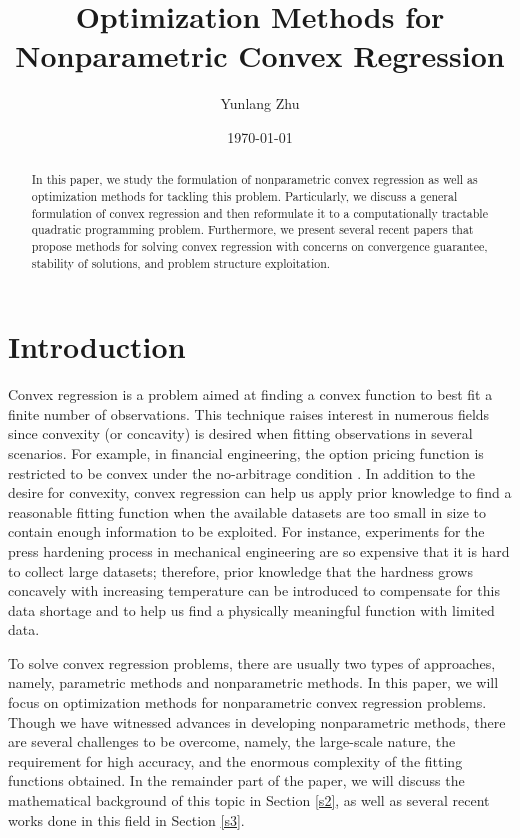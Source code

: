\documentclass{article}
\title{Optimization Methods for Nonparametric Convex Regression}
\author{Yunlang Zhu}
\date{\today}
\begin{document}
\maketitle

\begin{abstract}
    In this paper, we study the formulation of nonparametric convex regression as well as optimization methods for tackling this problem. Particularly, we discuss a general formulation of convex regression and then reformulate it to a computationally tractable quadratic programming problem. Furthermore, we present several recent papers that propose methods for solving convex regression with concerns on convergence guarantee, stability of solutions, and problem structure exploitation. 
\end{abstract}

\section{Introduction}
Convex regression is a problem aimed at finding a convex function to best fit a finite number of observations. This technique raises interest in numerous fields since convexity (or concavity) is desired when fitting observations in several scenarios. For example, in financial engineering, the option pricing function is restricted to be convex under the no-arbitrage condition \cite{Sahalia03}. In addition to the desire for convexity, convex regression can help us apply prior knowledge to find a reasonable fitting function when the available datasets are too small in size to contain enough information to be exploited. For instance, experiments for the press hardening process in mechanical engineering are so expensive that it is hard to collect large datasets; therefore, prior knowledge that the hardness grows concavely with increasing temperature \cite{Kurnatowski_2021} can be introduced to compensate for this data shortage and to help us find a physically meaningful function with limited data. 

To solve convex regression problems, there are usually two types of approaches, namely, parametric methods and nonparametric methods. In this paper, we will focus on optimization methods for nonparametric convex regression problems. Though we have witnessed advances in developing nonparametric methods, there are several challenges to be overcome, namely, the large-scale nature, the requirement for high accuracy, and the enormous complexity of the fitting functions obtained. In the remainder part of the paper, we will discuss the mathematical background of this topic in Section \ref{s2}, as well as several recent works done in this field in Section \ref{s3}.
\end{document}
